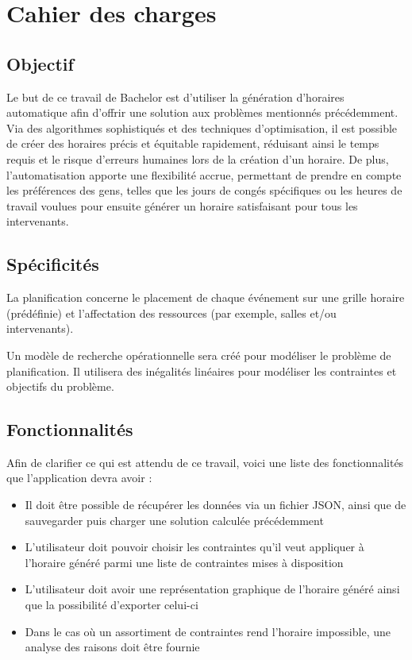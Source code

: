 \section{Cahier des charges}
\subsection{Objectif}
Le but de ce travail de Bachelor est d'utiliser la génération d'horaires automatique afin d'offrir une solution aux problèmes mentionnés précédemment. Via des algorithmes sophistiqués et des techniques d'optimisation, il est possible de créer des horaires précis et équitable rapidement, réduisant ainsi le temps requis et le risque d'erreurs humaines lors de la création d'un horaire. De plus, l'automatisation apporte une flexibilité accrue, permettant de prendre en compte les préférences des gens, telles que les jours de congés spécifiques ou les heures de travail voulues pour ensuite générer un horaire satisfaisant pour tous les intervenants.

\subsection{Spécificités}
La planification concerne le placement de chaque événement sur une grille horaire (prédéfinie) et l'affectation des ressources (par exemple, salles et/ou intervenants).

Un modèle de recherche opérationnelle sera créé pour modéliser le problème de planification. Il utilisera des inégalités linéaires pour modéliser les contraintes et objectifs du problème.

\subsection{Fonctionnalités}

Afin de clarifier ce qui est attendu de ce travail, voici une liste des fonctionnalités que l'application devra avoir :

\begin{itemize}
    \item Il doit être possible de récupérer les données via un fichier JSON, ainsi que de sauvegarder puis charger une solution calculée précédemment
    \item L'utilisateur doit pouvoir choisir les contraintes qu'il veut appliquer à l'horaire généré parmi une liste de contraintes mises à disposition
    \item L'utilisateur doit avoir une représentation graphique de l'horaire généré ainsi que la possibilité d'exporter celui-ci
    \item Dans le cas où un assortiment de contraintes rend l'horaire impossible, une analyse des raisons doit être fournie
\end{itemize}

